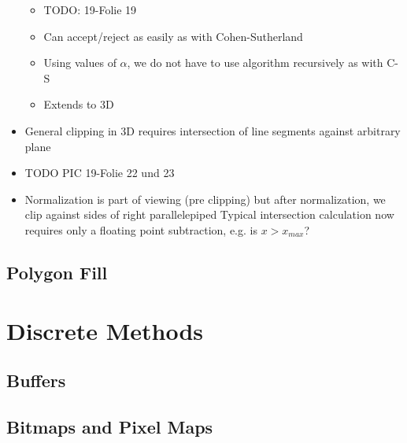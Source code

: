 \documentclass[11pt,a4paper]{article}
\begin{document}
\begin{itemize}
\begin{itemize}
					\item TODO: 19-Folie 19
					\item Can accept/reject as easily as with Cohen-Sutherland
					\item Using values of $\alpha$, we do not have to use algorithm recursively as with C-S
					\item Extends to 3D
				\end{itemize}
			\item General clipping in 3D requires intersection of line segments against arbitrary plane
			\item TODO PIC 19-Folie 22 und 23
			\item Normalization is part of viewing (pre clipping) but after normalization, we clip against sides of right parallelepiped Typical intersection calculation now requires only a floating point subtraction, e.g. is $x > x_{max}$?
		\end{itemize}
	\subsection{Polygon Fill}
	
\section{Discrete Methods}
	\subsection{Buffers}
	\subsection{Bitmaps and Pixel Maps}
\end{document}
